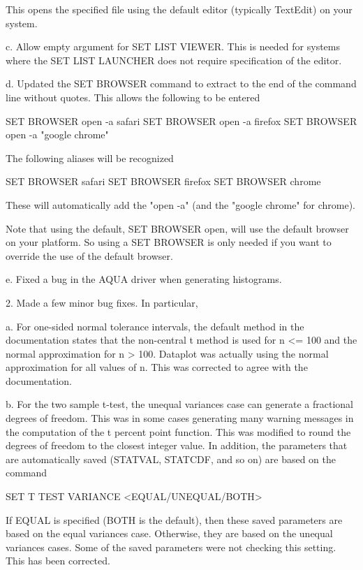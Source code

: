        This opens the specified file using the default editor
       (typically TextEdit) on your system.

    c. Allow empty argument for SET LIST VIEWER.  This is needed
       for systems where the SET LIST LAUNCHER does not require
       specification of the editor.

    d. Updated the SET BROWSER command to extract to the end of the
       command line without quotes.  This allows the following to be
       entered

           SET BROWSER open -a safari
           SET BROWSER open -a firefox
           SET BROWSER open -a "google chrome"

       The following aliases will be recognized

           SET BROWSER safari
           SET BROWSER firefox
           SET BROWSER chrome

       These will automatically add the "open -a" (and the
       "google chrome" for chrome).

       Note that using the default, SET BROWSER open, will use the
       default browser on your platform.  So using a SET BROWSER is
       only needed if you want to override the use of the default
       browser.

    e. Fixed a bug in the AQUA driver when generating histograms.

 2. Made a few minor bug fixes.  In particular,

    a. For one-sided normal tolerance intervals, the default method
       in the documentation states that the non-central t method is
       used for n <= 100 and the normal approximation for n > 100.
       Dataplot was actually using the normal approximation for all
       values of n.  This was corrected to agree with the documentation.

    b. For the two sample t-test, the unequal variances case can
       generate a fractional degrees of freedom.  This was in some
       cases generating many warning messages in the computation of
       the t percent point function.  This was modified to round the
       degrees of freedom to the closest integer value.  In addition,
       the parameters that are automatically saved (STATVAL, STATCDF,
       and so on) are based on the command

           SET T TEST VARIANCE <EQUAL/UNEQUAL/BOTH>

       If EQUAL is specified (BOTH is the default), then these saved
       parameters are based on the equal variances case.  Otherwise,
       they are based on the unequal variances cases.  Some of the
       saved parameters were not checking this setting.  This has been
       corrected.

